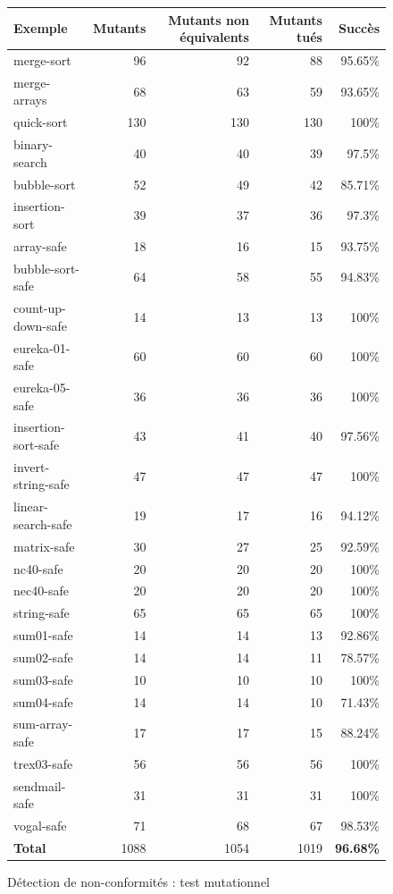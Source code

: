 \begin{figure}[tb]\scriptsize
  \begin{center}
    \begin{tabular}{lrrrr}
      \hline
      Exemple & Mutants & Mutants non équivalents & Mutants tués & Succès \\
      \hline
      merge-sort & 96  & 92 & 88 & 95.65\% \\ \hline
      merge-arrays & 68 & 63 & 59 & 93.65\% \\ \hline
      quick-sort & 130 & 130 & 130 & 100\% \\ \hline
      binary-search & 40 & 40 & 39 & 97.5\% \\ \hline
      bubble-sort & 52 & 49 & 42 & 85.71\% \\ \hline
      insertion-sort & 39 & 37 & 36 & 97.3\% \\ \hline
      array-safe & 18 & 16 & 15 & 93.75\% \\ \hline
      bubble-sort-safe & 64 & 58 & 55 & 94.83\% \\ \hline
      count-up-down-safe & 14 & 13 & 13 & 100\% \\ \hline
      eureka-01-safe & 60 & 60 & 60 & 100\% \\ \hline
      eureka-05-safe & 36 & 36 & 36 & 100\% \\ \hline
      insertion-sort-safe & 43 & 41 & 40 & 97.56\% \\ \hline
      invert-string-safe & 47 & 47 & 47 & 100\% \\ \hline
      linear-search-safe & 19 & 17 & 16 & 94.12\% \\ \hline
      matrix-safe & 30 & 27 & 25 & 92.59\% \\ \hline
      nc40-safe & 20 & 20 & 20 & 100\% \\ \hline
      nec40-safe & 20 & 20 & 20 & 100\% \\ \hline
      string-safe & 65 & 65 & 65 & 100\% \\ \hline
      sum01-safe & 14 & 14 & 13 & 92.86\% \\ \hline
      sum02-safe & 14 & 14 & 11 & 78.57\% \\ \hline
      sum03-safe & 10 & 10 & 10 & 100\% \\ \hline
      sum04-safe & 14 & 14 & 10 & 71.43\% \\ \hline
      sum-array-safe & 17 & 17 & 15 & 88.24\% \\ \hline
      trex03-safe & 56 & 56 & 56 & 100\% \\ \hline
      sendmail-safe & 31 & 31 & 31 & 100\% \\ \hline
      vogal-safe & 71 & 68 & 67 & 98.53\% \\ \hline
      \textbf{Total} & 1088 & 1054 & 1019 & \textbf{96.68\%} \\ \hline
    \end{tabular}
  \end{center}
  \vspace{-3mm}
  \caption{Détection de non-conformités : test mutationnel}
  \label{fig:scam-experiments2}
  \vspace{-3mm}
\end{figure}


